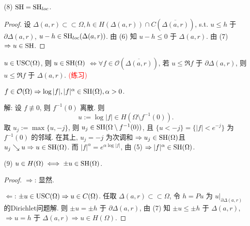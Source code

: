 \noindent (8) $\operatorname{SH}=\operatorname{SH}_{loc}$.
\begin{proof}
  设 $\Delta (a,r) \subset \subset \Omega , h \in H(\Delta (a,r))\cap C(\overline{\Delta (a,r)})$, s.t. $u \leq h $ 于 $\partial \Delta (a,r)$, $u-h \in \operatorname{SH}_{loc} (\Delta (a,r))$.    
  由 (6) 知 $u-h \leq 0$ 于 $\Delta (a,r)$. 由 (7) $\Rightarrow u \in \operatorname{SH}$.   
\end{proof}
 
\begin{remark}
  $u \in \operatorname{USC}(\Omega )$, 则 $u \in \operatorname{SH}(\Omega )$ $\iff \forall f \in \mathcal{O}(\overline{\Delta (a,r)})$, 若 $u \leq \Re f$ 于 $\partial \Delta (a,r)$, 则    $u \leq \Re f$ 于 $\Delta (a,r)$. \textcolor{red}{(练习) }
\end{remark}

\begin{example}
  $f \in \mathcal{O}(\Omega ) \Rightarrow \log|f|,|f|^{\alpha } \in \operatorname{SH}(\Omega ), \alpha >0$.
  
  \noindent 解: 设 $f \not \equiv 0$, 则 $f^{-1}(0)$ 离散. 则
  $$ u:=\log|f| \in H(\Omega \setminus f^{-1}(0)) .$$ 
  取 $u_j:=\max\{u,-j\}$, 则 $u_j \in \operatorname{SH}(\Omega \setminus f^{-1}(0))$, 且 $\{u<-j\}=\{|f|<e^{-j}\}$ 为 $f^{-1}(0)$ 的邻域. 在其上, $u_j=-j$ 为次调和 $\Rightarrow u_j \in \operatorname{SH}(\Omega )$且 $u_j \searrow u \Rightarrow u \in \operatorname{SH} (\Omega )$. 而 $|f|^{\alpha }=e^{\alpha \log|f|}$, 由 (5) $\Rightarrow |f|^{\alpha } \in \operatorname{SH}(\Omega )$.         
\end{example}

\noindent (9) $u \in H(\Omega ) \iff \pm u \in \operatorname{SH}(\Omega )$.
\begin{proof}
  $\Rightarrow $: 显然. 
  
  $\Leftarrow $: $\pm u \in \operatorname{USC}(\Omega ) \Rightarrow u \in C(\Omega )$. 
  任取 $\Delta (a,r) \subset \subset  \Omega $, 令 $h=Pu$  为 $u|_{\partial \Delta (a,r)}$ 的Dirichlet问题解. 则 $\pm u=\pm h$ 于 $\partial \Delta (a,r)$, 由 (7) 知 $\pm u \leq \pm h$ 于 $\Delta (a,r)$, $\Rightarrow u=h$   于 $\Delta (a,r) \Rightarrow u \in H(\Omega )$.
\end{proof}


